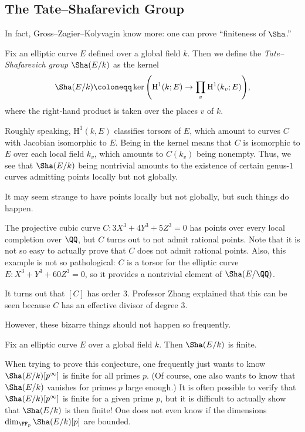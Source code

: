 \documentclass[../notes.tex]{subfiles}
\begin{document}
\subsection{The Tate--Shafarevich Group}
In fact, Gross--Zagier--Kolyvagin know more: one can prove ``finiteness of $\Sha$.''
\begin{definition}
	Fix an elliptic curve $E$ defined over a global field $k$. Then we define the \textit{Tate--Shafarevich group} $\Sha(E/k)$ as the kernel
	\[\Sha(E/k)\coloneqq\ker\Bigg(\mathrm H^1(k;E)\to\prod_v\mathrm H^1(k_v;E)\Bigg),\]
	where the right-hand product is taken over the places $v$ of $k$.
\end{definition}
\begin{remark}
	Roughly speaking, $\mathrm H^1(k,E)$ classifies torsors of $E$, which amount to curves $C$ with Jacobian isomorphic to $E$. Being in the kernel means that $C$ is isomorphic to $E$ over each local field $k_v$, which amounts to $C(k_v)$ being nonempty. Thus, we see that $\Sha(E/k)$ being nontrivial amounts to the existence of certain genus-$1$ curves admitting points locally but not globally.
\end{remark}
It may seem strange to have points locally but not globally, but such things do happen.
\begin{example}
	The projective cubic curve $C\colon 3X^3+4Y^3+5Z^3=0$ has points over every local completion over $\QQ$, but $C$ turns out to not admit rational points. Note that it is not so easy to actually prove that $C$ does not admit rational points. Also, this example is not so pathological: $C$ is a torsor for the elliptic curve $E\colon X^3+Y^3+60Z^3=0$, so it provides a nontrivial element of $\Sha(E/\QQ)$.
\end{example}
\begin{remark}
	It turns out that $[C]$ has order $3$. Professor Zhang explained that this can be seen because $C$ has an effective divisor of degree $3$.
\end{remark}
However, these bizarre things should not happen so frequently.
\begin{conj}
	Fix an elliptic curve $E$ over a global field $k$. Then $\Sha(E/k)$ is finite.
\end{conj}
\begin{remark}
	When trying to prove this conjecture, one frequently just wants to know $\Sha(E/k)[p^\infty]$ is finite for all primes $p$. (Of course, one also wants to know that $\Sha(E/k)$ vanishes for primes $p$ large enough.) It is often possible to verify that $\Sha(E/k)[p^\infty]$ is finite for a given prime $p$, but it is difficult to actually show that $\Sha(E/k)$ is then finite! One does not even know if the dimensions $\dim_{\FF_p}\Sha(E/k)[p]$ are bounded.
\end{remark}
\end{document}
